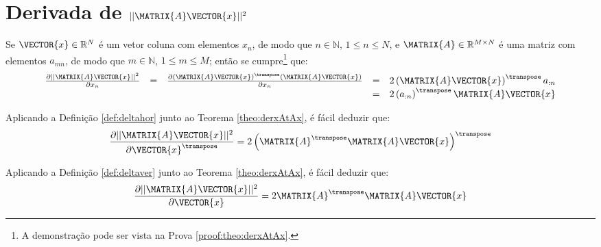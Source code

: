 
\section{Derivada de $||\MATRIX{A}\VECTOR{x}||^2$ 
}

\begin{theorem}\label{theo:derxAtAx}
Se 
$\VECTOR{x}\in \mathbb{R}^N$ é um vetor coluna com elementos $x_n$, de modo que
$n\in \mathbb{N}$, $1 \leq n \leq N$, e 
$\MATRIX{A} \in \mathbb{R}^{M\times N}$ é uma matriz com elementos $a_{mn}$, de modo que
$m\in \mathbb{N}$, $1 \leq m \leq M$; 
então se cumpre\footnote{A demonstração pode ser vista na Prova \ref{proof:theo:derxAtAx}.} que:
\begin{equation}
\begin{matrix}
\frac{\partial ||\MATRIX{A}\VECTOR{x}||^2 }{\partial x_n}&=&
\frac{\partial \left(\MATRIX{A}\VECTOR{x}\right)^{\transpose}\left(\MATRIX{A}\VECTOR{x}\right)}{\partial x_n}&=&
2\left(\MATRIX{A}\VECTOR{x}\right)^{\transpose}a_{:n}\\
~&~&~&=& 2\left(a_{:n}\right)^{\transpose}\MATRIX{A}\VECTOR{x}
\end{matrix}
\end{equation}
\end{theorem}

\begin{corollary}\label{coro:derxAtAx1}
Aplicando a Definição \ref{def:deltahor} junto ao Teorema \ref{theo:derxAtAx}, é
fácil deduzir que:
\begin{equation}
\frac{\partial ||\MATRIX{A}\VECTOR{x}||^2 }{\partial \VECTOR{x}^{\transpose}}=
2\left(\MATRIX{A}^{\transpose}\MATRIX{A}\VECTOR{x}\right)^{\transpose}
\end{equation}
\end{corollary}

\begin{corollary}\label{coro:derxAtAx2}
Aplicando a Definição \ref{def:deltaver} junto ao Teorema \ref{theo:derxAtAx}, é
fácil deduzir que:
\begin{equation}
\frac{\partial ||\MATRIX{A}\VECTOR{x}||^2 }{\partial \VECTOR{x}}=
2 \MATRIX{A}^{\transpose}\MATRIX{A}\VECTOR{x}
\end{equation}
\end{corollary}
